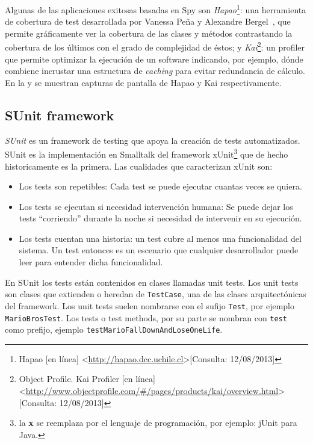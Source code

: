 \par Algunas de las aplicaciones exitosas basadas en Spy son \emph{Hapao}\footnote{Hapao [en línea] \textless\url{http://hapao.dcc.uchile.cl}\textgreater  [Consulta: 12/08/2013]}: una herramienta de cobertura de test desarrollada por Vanessa Peña y Alexandre Bergel~\cite{bergel2012increasing}, que permite gráficamente ver la cobertura de las clases y métodos contrastando la cobertura de los últimos con el grado de complejidad de éstos; y \emph{Kai}\footnote{Object Profile. Kai Profiler [en línea] \textless\url{http://www.objectprofile.com/\#/pages/products/kai/overview.html}\textgreater  [Consulta: 12/08/2013] }: un profiler que permite optimizar la ejecución de un software indicando, por ejemplo, dónde combiene incrustar una estructura de \emph{caching} para evitar redundancia de cálculo. En la  y  se muestran capturas de pantalla de Hapao y Kai respectivamente.


\clearpage
\subsection{SUnit framework}

\par \emph{SUnit} es un framework de testing que apoya la creación de tests automatizados. SUnit es la implementación en Smalltalk del framework xUnit\footnote{la \textbf{x} se reemplaza por el lenguaje de programación, por ejemplo: jUnit para Java.} que de hecho historicamente es la primera. Las cualidades que caracterizan xUnit son:

\begin{itemize}
\item Los tests son repetibles: Cada test se puede ejecutar cuantas veces se quiera.
\item Los tests se ejecutan si necesidad intervención humana: Se puede dejar los tests ``corriendo'' durante la noche si necesidad de intervenir en su ejecución.
\item Los tests cuentan una historia: un test cubre al menos una funcionalidad del sistema. Un test entonces es un escenario que cualquier desarrollador puede leer para entender dicha funcionalidad.
\end{itemize}

\par En SUnit los tests están contenidos en clases llamadas unit tests. Los unit tests son clases que extienden o heredan de {\tt TestCase}, una de las clases arquitectónicas del framework. Los unit tests suelen nombrarse con el sufijo {\tt Test}, por ejemplo {\tt MarioBrosTest}. Los tests o test methods, por su parte se nombran con {\tt test} como prefijo, ejemplo {\tt testMarioFallDownAndLoseOneLife}.


